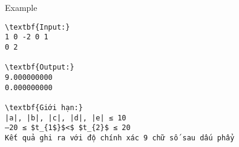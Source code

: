 Example
\begin{verbatim}
\textbf{Input:}
1 0 -2 0 1
0 2

\textbf{Output:}
9.000000000
0.000000000

\textbf{Giới hạn:}
|a|, |b|, |c|, |d|, |e| ≤ 10
–20 ≤ $t_{1$}$<$ $t_{2}$ ≤ 20
Kết quả ghi ra với độ chính xác 9 chữ số sau dấu phẩy
\end{verbatim}